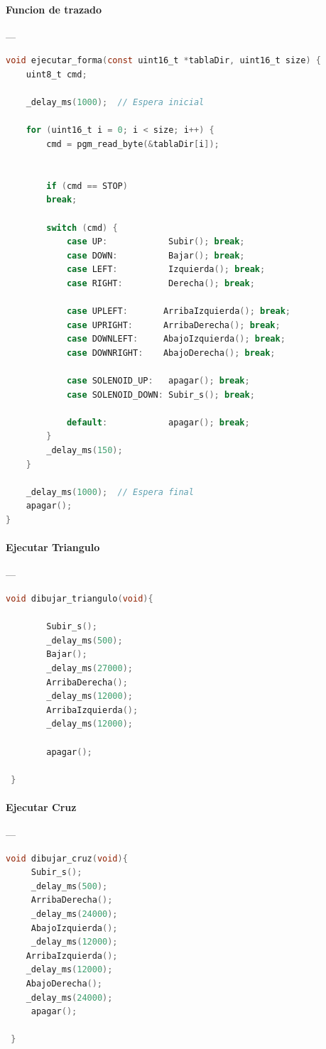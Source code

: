 \paragraph{Funcion de trazado}\label{anexo:funcion_trazado}---\\
\begin{lstlisting}[language=C, caption={Funcion de trazado}]
void ejecutar_forma(const uint16_t *tablaDir, uint16_t size) {
	uint8_t cmd;

	_delay_ms(1000);  // Espera inicial

	for (uint16_t i = 0; i < size; i++) {
		cmd = pgm_read_byte(&tablaDir[i]); 
		

		if (cmd == STOP)
		break;

		switch (cmd) {
			case UP:            Subir(); break;
			case DOWN:          Bajar(); break;
			case LEFT:          Izquierda(); break;
			case RIGHT:         Derecha(); break;

			case UPLEFT:       ArribaIzquierda(); break;
			case UPRIGHT:      ArribaDerecha(); break;
			case DOWNLEFT:     AbajoIzquierda(); break;
			case DOWNRIGHT:    AbajoDerecha(); break;

			case SOLENOID_UP:   apagar(); break;
			case SOLENOID_DOWN: Subir_s(); break;

			default:            apagar(); break;
		}
		_delay_ms(150);
	}

	_delay_ms(1000);  // Espera final
	apagar();
}

\end{lstlisting}


\paragraph{Ejecutar Triangulo}\label{anexo:triangulo}---\\
\begin{lstlisting}[language=C, caption={Ejecutar Triangulo}]
 void dibujar_triangulo(void){
	
		Subir_s();
		_delay_ms(500);
		Bajar();   
		_delay_ms(27000); 
		ArribaDerecha();  
		_delay_ms(12000);
		ArribaIzquierda();   
		_delay_ms(12000);
		
		apagar();
		
 }
\end{lstlisting}

\paragraph{Ejecutar Cruz}\label{anexo:cruz}---\\
\begin{lstlisting}[language=C, caption={Ejecutar Cruz}]
 void dibujar_cruz(void){
	 Subir_s();
	 _delay_ms(500);
	 ArribaDerecha();
	 _delay_ms(24000);
	 AbajoIzquierda();
	 _delay_ms(12000);
	ArribaIzquierda();
	_delay_ms(12000);
	AbajoDerecha();
	_delay_ms(24000);
	 apagar();
	 
 }
\end{lstlisting}

